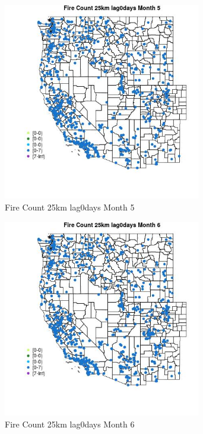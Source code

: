 \begin{figure} 
\centering  
\includegraphics[width=0.77\textwidth]{Code_Outputs/Report_ML_input_PM25_Step4_part_e_de_duplicated_aves_compiled_2019-05-21wNAs_MapObsMo5Fire_Count_25km_lag0days.jpg} 
\caption{\label{fig:Report_ML_input_PM25_Step4_part_e_de_duplicated_aves_compiled_2019-05-21wNAsMapObsMo5Fire_Count_25km_lag0days}Fire Count 25km lag0days Month 5} 
\end{figure} 
 

\begin{figure} 
\centering  
\includegraphics[width=0.77\textwidth]{Code_Outputs/Report_ML_input_PM25_Step4_part_e_de_duplicated_aves_compiled_2019-05-21wNAs_MapObsMo6Fire_Count_25km_lag0days.jpg} 
\caption{\label{fig:Report_ML_input_PM25_Step4_part_e_de_duplicated_aves_compiled_2019-05-21wNAsMapObsMo6Fire_Count_25km_lag0days}Fire Count 25km lag0days Month 6} 
\end{figure} 
 

